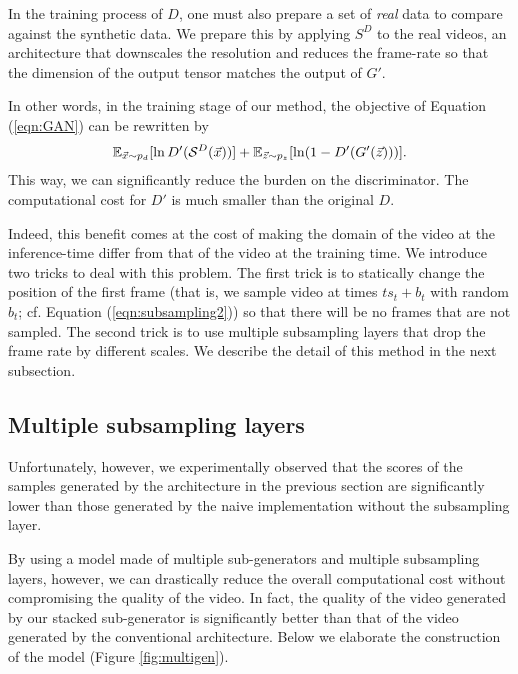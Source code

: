 \documentclass[twocolumn]{svjour3}
\def\Eq#1{Equation (\ref{eqn:#1})}
\def\Fig#1{Figure \ref{fig:#1}}
\begin{document}
In the training process of $D$, one must also prepare a set of \textit{real} data to compare against the synthetic data.
We prepare this by applying $S^D$ to the real videos, an architecture that downscales the resolution and reduces the frame-rate so that the dimension of the output tensor matches the output of $G'$.

In other words, in the training stage of our method, the objective of \Eq{GAN}
can be rewritten by
\begin{align}
    \mathbb{E}_{\vec{x} \sim p_d}[\ln D'({\cal S}^D(\vec{x}))] +
    \mathbb{E}_{\vec{z} \sim p_z}[\ln (1 - D'(G'(\vec{z})))].
\end{align}
This way, we can significantly reduce the burden on the discriminator.
The computational cost for $D'$ is much smaller than the original $D$.

Indeed, this benefit comes at the cost of making the domain of the video at the inference-time differ from that of the video at the training time.
We introduce two tricks to deal with this problem.
The first trick is to statically change the position of the first frame (that is, we sample video at times $t s_t + b_t$ with random $b_t$; cf. \Eq{subsampling2}) so that there will be no frames that are not sampled.
The second trick is to use multiple subsampling layers that drop the frame rate by different scales.
We describe the detail of this method in the next subsection.

\subsection{Multiple subsampling layers}
\label{sec:multi_abstract_layers}




Unfortunately, however, we experimentally observed that the scores of the samples generated by the architecture in the previous section are significantly lower than those generated by the naive implementation without the subsampling layer.

By using a model made of multiple sub-generators and multiple subsampling layers, however, we can drastically reduce the overall computational cost without compromising the quality of the video.
In fact, the quality of the video generated by our stacked sub-generator is significantly better than that of the video generated by the conventional architecture.
Below we elaborate the construction of the model (\Fig{multigen}).
\end{document}
